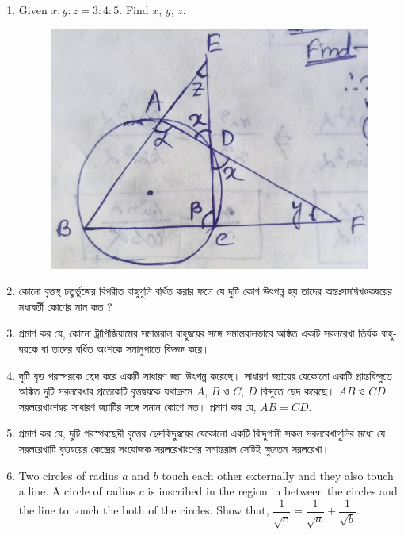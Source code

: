 \documentclass[11pt, a4paper]{article}
\begin{document}
\begin{enumerate}
	\item  Given $x:y:z = 3:4:5$. Find $x$, $y$, $z$.
	\begin{figure}[H]
	\centering
	\includegraphics[scale = 0.1]{IMG_20230723_153249_398}\\
	\end{figure}

	\item \textbengali{কোনো বৃত্তস্থ চতুর্ভুজের বিপরীত বাহুগুলি বর্ধিত করার ফলে যে দুটি কোণ উৎপন্ন হয় তাদের অন্তঃসমদ্বিখণ্ডকদ্বয়ের মধ্যবর্তী কোণের মান কত ?}

	\item \textbengali{প্রমাণ কর যে, কোনো ট্রাপিজিয়ামের সমান্তরাল বাহুদ্বয়ের সঙ্গে সমান্তরালভাবে অঙ্কিত একটি সরলরেখা তির্যক বাহুদ্বয়কে বা তাদের বর্ধিত অংশকে সমানুপাতে বিভক্ত করে।} 
	
	\item \textbengali{দুটি বৃত্ত পরস্পরকে ছেদ করে একটি সাধারণ জ্যা উৎপন্ন করেছে।  সাধারণ জ্যায়ের যেকোনো একটি প্রান্তবিন্দুতে অঙ্কিত দুটি সরলরেখার প্রত্যেকটি বৃত্তদ্বয়কে যথাক্রমে} $A$, $B$ \textbengali{ও} $C$, $D$ \textbengali{বিন্দুতে ছেদ করেছে।} $AB$ \textbengali{ও} $CD$ \textbengali{সরলরেখাংশদ্বয় সাধারণ জ্যাটির সঙ্গে সমান কোণে নত। প্রমাণ কর যে, }$AB = CD$.
	
	\item \textbengali{প্রমাণ কর যে, দুটি পরস্পরছেদী বৃত্তের ছেদবিন্দুদ্বয়ের যেকোনো একটি বিন্দুগামী সকল সরলরেখাগুলির মধ্যে যে সরলরেখাটি বৃত্তদ্বয়ের কেন্দ্রের সংযোজক সরলরেখাংশের সমান্তরাল সেটিই ক্ষুদ্রতম সরলরেখা।}
	
	\item Two circles of radius $a$ and $b$ touch each other externally and they also touch a line. A circle of radius $c$ is inscribed in the region in between the circles and the line to touch the both of the circles. Show that, $\dfrac{1}{\sqrt{c}} = \dfrac{1}{\sqrt{a}} + \dfrac{1}{\sqrt{b}}$.
	

\end{enumerate}
\end{document}
